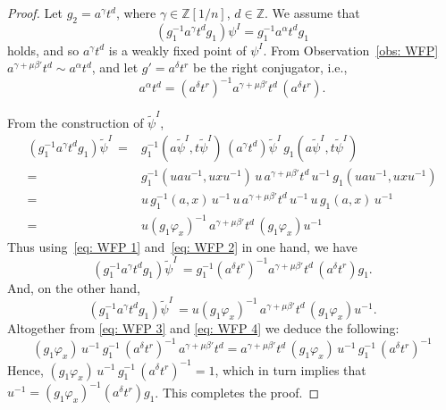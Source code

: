 \documentclass[a4paper]{amsart}
\theoremstyle{definition}
\newcommand\ZZ{\mathbb{Z}}
\begin{document}
\begin{proof}
    Let $g_2 = a^{\gamma} t^d$, where $\gamma \in \ZZ[1/n]$, $d \in \ZZ$. We assume that 
    \begin{equation}\label{eq: WFP 1}
         (g_1^{-1} a^{\gamma} t^d g_1)\psi^{I} = g_1^{-1} a^{\alpha}t^d g_1
    \end{equation}
    holds, and so $a^{\gamma} t^d$ is a weakly fixed point of $\psi^{I}$. From Observation~\ref{obs: WFP} $a^{\gamma + \mu \beta'} t^d \sim a^{\alpha} t^d$, and let $g' = a^\delta t^r$ be the right conjugator, i.e.,
%
\begin{equation}\label{eq: WFP 2}
    a^\alpha t^d = (a^\delta t^r)^{-1} a^{\gamma + \mu \beta'} t^d \, (a^\delta t^r).
\end{equation}

From the construction of $\widetilde{\psi}^I$,
%
$$
\begin{array}{rl}
   (g_1^{-1} a^{\gamma}t^d g_1)\widetilde{\psi}^I \, = & g_1^{-1}(a\widetilde{\psi}^I, t\widetilde{\psi}^I) \, (a^{\gamma}t^d)\widetilde{\psi}^I \,  g_1(a\widetilde{\psi}^I, t\widetilde{\psi}^I) \\
    = & g_1^{-1}(uau^{-1}, uxu^{-1}) \,  u \, a^{\gamma + \mu \beta'} t^d \, u^{-1} \,  g_1(uau^{-1}, uxu^{-1})\\
    = & u \, g_1^{-1}(a,x) \, u^{-1} \, u\, a^{\gamma + \mu \beta'} t^d \, u^{-1} \, u\, g_1(a, x)\, u^{-1}\\
    = & u (g_1\varphi_x)^{-1} \, a^{\gamma + \mu \beta'} t^d \, (g_1\varphi_x) u^{-1}
\end{array}
$$
%
Thus using~\eqref{eq: WFP 1} and~\eqref{eq: WFP 2}  in one hand, we have
%
\begin{equation}\label{eq: WFP 3}
    (g_1^{-1} a^{\gamma}t^d g_1)\widetilde{\psi}^I \, = g_1^{-1} (a^\delta t^r)^{-1} a^{\gamma + \mu \beta'} t^d \, (a^\delta t^r) g_1.
\end{equation}
And, on the other hand,
%
\begin{equation}\label{eq: WFP 4}
    (g_1^{-1} a^{\gamma}t^d g_1)\widetilde{\psi}^I \, = u (g_1\varphi_x)^{-1} \, a^{\gamma + \mu \beta'} t^d \, (g_1\varphi_x) u^{-1}.
\end{equation}
%
Altogether from \eqref{eq: WFP 3} and \eqref{eq: WFP 4} we deduce the following:
%
\[
(g_1\varphi_x)\, u^{-1}\, g_1^{-1}\, (a^\delta t^r)^{-1} \, a^{\gamma + \mu \beta'} t^d = a^{\gamma + \mu \beta'} t^d \, (g_1\varphi_x)\, u^{-1}\, g_1^{-1}\, (a^\delta t^r)^{-1}
\]
%
Hence, $(g_1\varphi_x)\, u^{-1}\, g_1^{-1}\, (a^\delta t^r)^{-1} =1$, which in turn implies that $u^{-1} = (g_1\varphi_x)^{-1} (a^\delta t^r) g_1$. This completes the proof.
\end{proof}
\end{document}
